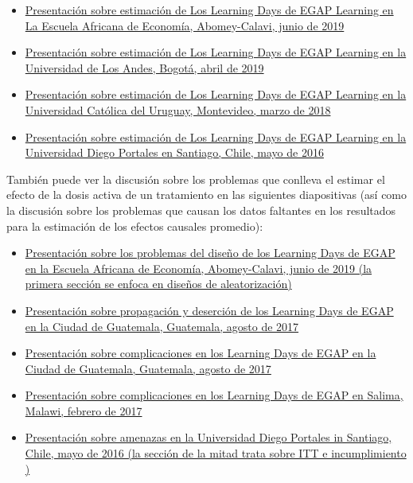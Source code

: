 \documentclass[
  12pt,
  spanish,
]{book}
\begin{document}
\begin{itemize}
\item
  \href{https://egap.github.io/learningdays-resources/Slides/Examples/estimation-benin.pdf}{Presentación sobre estimación de Los Learning Days de EGAP Learning en La Escuela Africana de Economía, Abomey-Calavi, junio de 2019}
\item
  \href{https://egap.github.io/learningdays-resources/Slides/Examples/estimation-bogota.pdf}{Presentación sobre estimación de Los Learning Days de EGAP Learning en la Universidad de Los Andes, Bogotá, abril de 2019}
\item
  \href{https://egap.github.io/learningdays-resources/Slides/Examples/estimation-montevideo.pdf}{Presentación sobre estimación de Los Learning Days de EGAP Learning en la Universidad Católica del Uruguay, Montevideo, marzo de 2018}
\item
  \href{https://egap.github.io/learningdays-resources/Slides/Examples/estimation-santiago.pdf}{Presentación sobre estimación de Los Learning Days de EGAP Learning en la Universidad Diego Portales en Santiago, Chile, mayo de 2016}
\end{itemize}

También puede ver la discusión sobre los problemas que conlleva el estimar el efecto de la dosis activa de un tratamiento en las siguientes diapositivas (así como la discusión sobre los problemas que causan los datos faltantes en los resultados para la estimación de los efectos causales promedio):

\begin{itemize}
\item
  \href{https://egap.github.io/learningdays-resources/Slides/Examples/threats-benin.pdf}{Presentación sobre los problemas del diseño de los Learning Days de EGAP en la Escuela Africana de Economía, Abomey-Calavi, junio de 2019 (la primera sección se enfoca en diseños de aleatorización)}
\item
  \href{https://egap.github.io/learningdays-resources/Slides/Examples/spillovers_attrition-guatemala.pdf}{Presentación sobre propagación y deserción de los Learning Days de EGAP en la Ciudad de Guatemala, Guatemala, agosto de 2017}
\item
  \href{https://egap.github.io/learningdays-resources/Slides/Examples/threats-guatemala.pdf}{Presentación sobre complicaciones en los Learning Days de EGAP en la Ciudad de Guatemala, Guatemala, agosto de 2017}
\item
  \href{https://egap.github.io/learningdays-resources/Slides/Examples/complications-malawi.pdf}{Presentación sobre complicaciones en los Learning Days de EGAP en Salima, Malawi, febrero de 2017}
\item
  \href{https://egap.github.io/learningdays-resources/Slides/Examples/threats-santiago.pdf}{Presentación sobre amenazas en la Universidad Diego Portales in Santiago, Chile, mayo de 2016 (la sección de la mitad trata sobre ITT e incumplimiento )}
\end{itemize}
\end{document}
